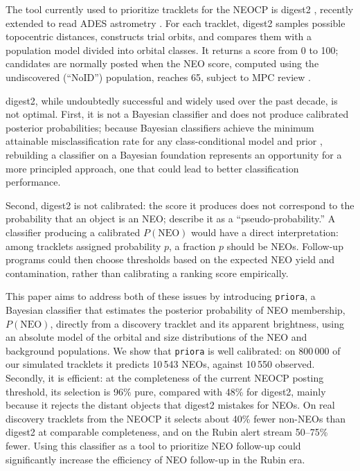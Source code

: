 \documentclass[linenumbers,twocolumn]{aastex701}
\newcommand{\priora}{{\tt priora}\xspace} %
\begin{document}
The tool currently used to prioritize tracklets for the NEOCP is digest2
\citep{keys2019}, recently extended to read ADES astrometry
\citep{veres2023}. For each tracklet, digest2 samples possible topocentric
distances, constructs trial orbits, and compares them with a population model
divided into orbital classes. It returns a score from 0 to 100; candidates are
normally posted when the NEO score, computed using the undiscovered
(``NoID'') population, reaches 65, subject to MPC review
\citep{veres2025ml}.

digest2, while undoubtedly successful and widely used over the past decade, is
not optimal. First, it is not a Bayesian classifier and does not produce
calibrated posterior probabilities; because Bayesian classifiers achieve the
minimum attainable misclassification rate for any class-conditional model and
prior \citep[e.g.,][]{duda2001}, rebuilding a classifier on a Bayesian
foundation represents an opportunity for a more principled approach, one that
could lead to better classification performance.

Second, digest2 is not calibrated: the score it produces does not correspond
to the probability that an object is an NEO; \citet{keys2019} describe it as a
``pseudo-probability.'' A classifier producing a calibrated $P(\mathrm{NEO})$
would have a direct interpretation: among tracklets assigned probability $p$,
a fraction $p$ should be NEOs. Follow-up programs could then choose thresholds
based on the expected NEO yield and contamination, rather than calibrating a
ranking score empirically.

This paper aims to address both of these issues by introducing \priora, a
Bayesian classifier that estimates the posterior probability of NEO
membership, $P(\mathrm{NEO})$, directly from a discovery tracklet and its
apparent brightness, using an absolute model of the orbital and size
distributions of the NEO and background populations. We show that \priora is
well calibrated: on 800\,000 of our simulated tracklets it predicts 10\,543
NEOs, against 10\,550 observed. Secondly, it is efficient: at the completeness
of the current NEOCP posting threshold, its selection is 96\% pure, compared
with 48\% for digest2, mainly because it rejects the distant objects that
digest2 mistakes for NEOs. On real discovery tracklets from the NEOCP it
selects about 40\% fewer non-NEOs than digest2 at comparable completeness, and
on the Rubin alert stream 50--75\% fewer. Using this classifier as a tool to
prioritize NEO follow-up could significantly increase the efficiency of NEO
follow-up in the Rubin era.
\end{document}
